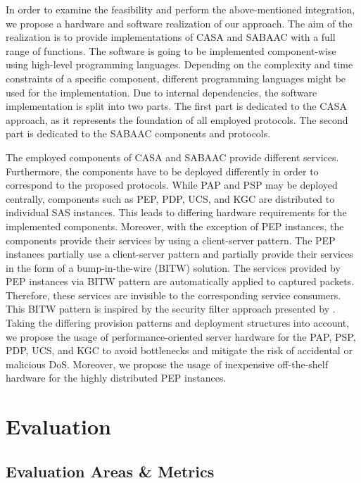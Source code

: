 In order to examine the feasibility and perform the above-mentioned integration, we propose a hardware and software realization of our approach.
The aim of the realization is to provide implementations of CASA and SABAAC with a full range of functions.
The software is going to be implemented component-wise using high-level programming languages.
Depending on the complexity and time constraints of a specific component, different programming languages might be used for the implementation.
Due to internal dependencies, the software implementation is split into two parts.
The first part is dedicated to the CASA approach, as it represents the foundation of all employed protocols.
The second part is dedicated to the SABAAC components and protocols.

The employed components of CASA and SABAAC provide different services.
Furthermore, the components have to be deployed differently in order to correspond to the proposed protocols.
While PAP and PSP may be deployed centrally, components such as PEP, PDP, UCS, and KGC are distributed to individual SAS instances.
This leads to differing hardware requirements for the implemented components.
Moreover, with the exception of PEP instances, the components provide their services by using a client-server pattern.
The PEP instances partially use a client-server pattern and partially provide their services in the form of a bump-in-the-wire (BITW) solution.
The services provided by PEP instances via BITW pattern are automatically applied to captured packets.
Therefore, these services are invisible to the corresponding service consumers.
This BITW pattern is inspired by the security filter approach presented by \citeauthor{Ishchenko2018} \cite{Ishchenko2018}.
Taking the differing provision patterns and deployment structures into account, we propose the usage of performance-oriented server hardware for the PAP, PSP, PDP, UCS, and KGC to avoid bottlenecks and mitigate the risk of accidental or malicious DoS.
Moreover, we propose the usage of inexpensive off-the-shelf hardware for the highly distributed PEP instances.

\section{Evaluation}
\label{sec:approach:evaluation}
\subsection{Evaluation Areas \& Metrics}
